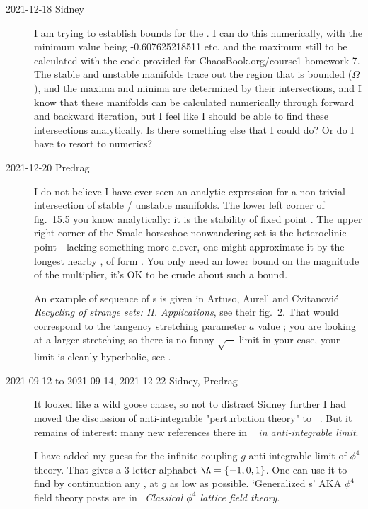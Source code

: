\begin{description}
\item[2021-12-18 Sidney]
I am trying to establish bounds for the \henlatt. I can do
this numerically, with the minimum value being -0.607625218511 etc. and
the maximum still to be calculated with the code provided for
ChaosBook.org/course1
{homework 7}. %
The stable and unstable
manifolds trace out the region that is bounded ($\Omega$), and the
maxima and minima are determined by their intersections, and I know
that these manifolds can be calculated numerically through forward and
backward iteration, but I feel like I should be able to find these
intersections analytically.
Is there something else
that I could do? Or do I have to resort to numerics?

\item[2021-12-20 Predrag]
I do not believe I have ever seen an analytic expression for a
non-trivial intersection of stable / unstable manifolds. The lower left
corner of  {fig.~15.5} you know
analytically: it is the stability of fixed point . The upper
right corner of the Smale horseshoe nonwandering set is the heteroclinic
point - lacking something more clever, one might approximate it by the
longest nearby \po, of form . You only need an lower
bound on the magnitude of the multiplier, it's OK to be crude about such
a bound.

An example of  sequence of {\po}s is given in
Artuso, Aurell and Cvitanovi\'c
{\em Recycling of strange sets: {II. Applications}}, see their
 {fig.~2}.
That would correspond to the tangency stretching parameter $a$
value ; you are looking at a larger stretching
so there is no funny $\sqrt{\cdots}$ limit in your case, your limit is
cleanly hyperbolic, see .

\item[2021-09-12 to 2021-09-14, 2021-12-22 Sidney, Predrag]
It looked like a wild goose chase, so not to distract Sidney further I had
moved the discussion of anti-integrable "perturbation theory" to
~{\em \Henlatt}.
But it remains of interest: many new references there in
~{\em {\Henlatt} in anti-integrable limit}.

I have added my guess  for the infinite coupling $g$
anti-integrable limit of $\phi^4$ theory. That gives a 3-letter
alphabet $\A=\{-1,0,1\}$. One can use it to find by
continuation any {\lattstate}, at $g$ as low as possible.
`Generalized {\HenonMap}s' AKA $\phi^4$ field theory posts are in
~{\em Classical {$\phi^4$} lattice field theory}.


\end{description}

